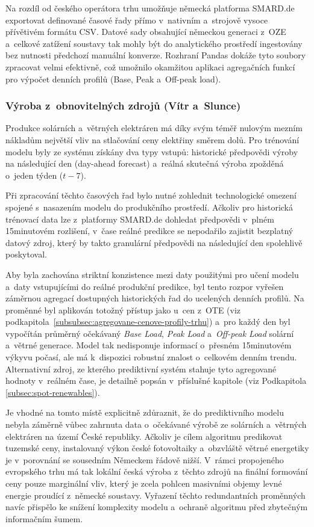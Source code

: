 \documentclass[a4paper]{article}
\begin{document}
Na rozdíl od českého operátora trhu umožňuje německá platforma SMARD.de exportovat definované časové řady přímo v~nativním a~strojově vysoce přívětivém formátu CSV. Datové sady obsahující německou generaci z~OZE a~celkové zatížení soustavy tak mohly být do analytického prostředí ingestovány bez nutnosti předchozí manuální konverze. Rozhraní Pandas dokáže tyto soubory zpracovat velmi efektivně, což umožnilo okamžitou aplikaci agregačních funkcí pro výpočet denních profilů (Base, Peak a~Off-peak load).

\subsubsection{Výroba z~obnovitelných zdrojů (Vítr a~Slunce)}
Produkce solárních a~větrných elektráren má díky svým téměř nulovým mezním nákladům největší vliv na stlačování ceny elektřiny směrem dolů. Pro trénování modelu byly ze systému získány dva typy vstupů: historické předpovědi výroby na následující den (day-ahead forecast) a~reálná skutečná výroba zpožděná o~jeden týden ($t-7$).

Při zpracování těchto časových řad bylo nutné zohlednit technologické omezení spojené s~nasazením modelu do produkčního prostředí. Ačkoliv pro historická trénovací data lze z~platformy SMARD.de dohledat předpovědi v~plném 15minutovém rozlišení, v~čase reálné predikce se nepodařilo zajistit bezplatný datový zdroj, který by takto granulární předpovědi na následující den spolehlivě poskytoval.

Aby byla zachována striktní konzistence mezi daty použitými pro učení modelu a~daty vstupujícími do reálné produkční predikce, byl tento rozpor vyřešen záměrnou agregací dostupných historických řad do ucelených denních profilů. Na proměnné byl aplikován totožný přístup jako u~cen z~OTE (viz podkapitola~\ref{subsubsec:agregovane-cenove-profily-trhu}) a~pro každý den byl vypočítán průměrný očekávaný \textit{Base Load}, \textit{Peak Load} a~\textit{Off-peak Load} solární a~větrné generace. Model tak nedisponuje informací o~přesném 15minutovém výkyvu počasí, ale má k~dispozici robustní znalost o~celkovém denním trendu. Alternativní zdroj, ze kterého prediktivní systém stahuje tyto agregované hodnoty v~reálném čase, je detailně popsán v~příslušné kapitole (viz Podkapitola \ref{subsec:spot-renewables}).

Je vhodné na tomto místě explicitně zdůraznit, že do prediktivního modelu nebyla záměrně vůbec zahrnuta data o~očekávané výrobě ze solárních a~větrných elektráren na území České republiky. Ačkoliv je cílem algoritmu predikovat tuzemské ceny, instalovaný výkon české fotovoltaiky a~obzvláště větrné energetiky je v~porovnání se sousedním Německem řádově nižší. V~rámci propojeného evropského trhu má tak lokální česká výroba z~těchto zdrojů na finální formování ceny pouze marginální vliv, který je zcela pohlcen masivními objemy levné energie proudící z~německé soustavy. Vyřazení těchto redundantních proměnných navíc přispělo ke snížení komplexity modelu a~ochraně algoritmu před zbytečným informačním šumem.
\end{document}
